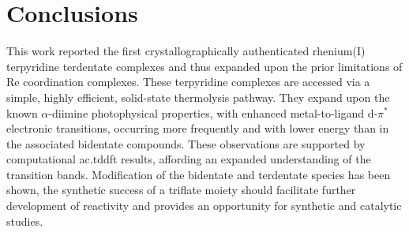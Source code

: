 \FloatBarrier
\section{Conclusions}

This work reported the first crystallographically authenticated rhenium(I) terpyridine terdentate complexes and thus expanded upon the prior limitations of Re coordination complexes. These terpyridine complexes are accessed via a simple, highly efficient, solid-state thermolysis pathway. They expand upon the known $\alpha$-diimine photophysical properties, with enhanced metal-to-ligand d-$\pi^\ast$ electronic transitions, occurring more frequently and with lower energy than in the associated bidentate compounds. These observations are supported by computational \gls{ac.tddft} results, affording an expanded understanding of the transition bands. Modification of the bidentate and terdentate species has been shown, the synthetic success of a triflate moiety should facilitate further development of reactivity and provides an opportunity for synthetic and catalytic studies.



